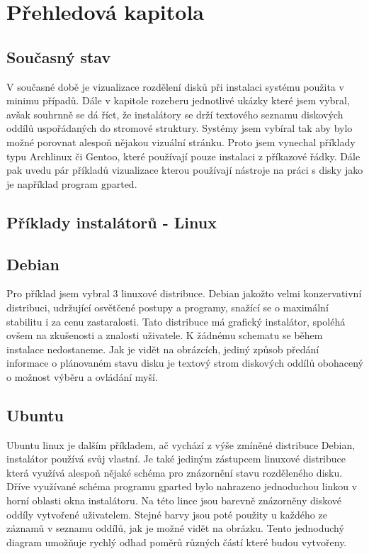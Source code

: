 \documentclass{article}
\begin{document}
\chapter{Přehledová kapitola}
\section{Současný stav}

V současné době je vizualizace rozdělení disků při instalaci systému použita v minimu případů. Dále v kapitole rozeberu jednotlivé ukázky které jsem vybral, avšak souhrnně se dá říct, že instalátory se drží textového seznamu diskových oddílů uspořádaných do stromové struktury. Systémy jsem vybíral tak aby bylo možné porovnat alespoň nějakou vizuální stránku. Proto jsem vynechal příklady typu Archlinux či Gentoo, které používají pouze instalaci z  příkazové řádky.  Dále pak uvedu pár příkladů vizualizace kterou používají nástroje na práci s disky jako je například program gparted.

\section{Příklady instalátorů - Linux}

\section{Debian}

Pro příklad jsem vybral 3 linuxové distribuce. Debian jakožto velmi konzervativní distribuci, udržující osvětčené postupy a programy, snažící se o maximální stabilitu i za cenu zastaralosti. Tato distribuce má grafický instalátor, spoléhá ovšem na zkušenosti a znalosti uživatele. K žádnému schematu se během instalace nedostaneme. Jak je vidět na obrázcích, jediný způsob předání informace o plánovaném stavu disku je textový strom diskových oddílů obohacený o možnost výběru a ovládání myší. 

\section{Ubuntu}

Ubuntu linux je dalším příkladem, ač vychází z výše zmíněné distribuce Debian, instalátor používá svůj vlastní. Je také jediným zástupcem linuxové distribuce která využívá alespoň nějaké schéma pro znázornění stavu rozděleného disku. Dříve využívané schéma programu gparted bylo nahrazeno jednoduchou linkou v horní oblasti okna instalátoru. Na této lince jsou barevně znázorněny diskové oddíly vytvořené uživatelem. Stejné barvy jsou poté použity u každého ze záznamů v seznamu oddílů, jak je možné vidět na obrázku. Tento jednoduchý diagram umožňuje rychlý odhad poměrů různých částí které budou vytvořeny.
\end{document}
